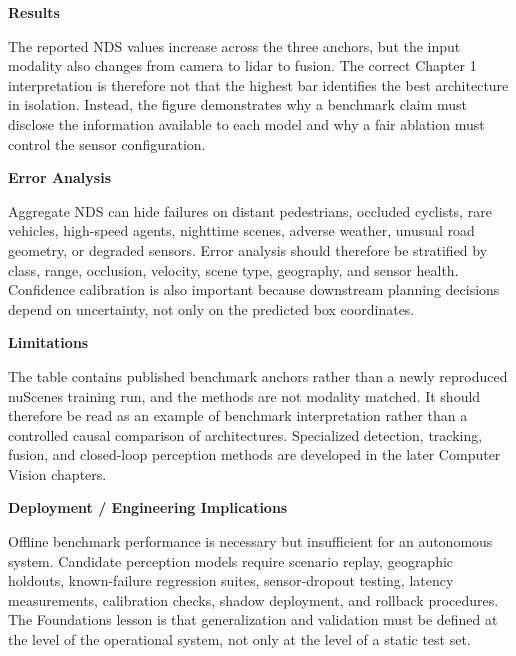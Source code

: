 \textbf{Results}

The reported NDS values increase across the three anchors, but the input modality also changes from camera to lidar to fusion. The correct Chapter 1 interpretation is therefore not that the highest bar identifies the best architecture in isolation. Instead, the figure demonstrates why a benchmark claim must disclose the information available to each model and why a fair ablation must control the sensor configuration.

\textbf{Error Analysis}

Aggregate NDS can hide failures on distant pedestrians, occluded cyclists, rare vehicles, high-speed agents, nighttime scenes, adverse weather, unusual road geometry, or degraded sensors. Error analysis should therefore be stratified by class, range, occlusion, velocity, scene type, geography, and sensor health. Confidence calibration is also important because downstream planning decisions depend on uncertainty, not only on the predicted box coordinates.

\textbf{Limitations}

The table contains published benchmark anchors rather than a newly reproduced nuScenes training run, and the methods are not modality matched. It should therefore be read as an example of benchmark interpretation rather than a controlled causal comparison of architectures. Specialized detection, tracking, fusion, and closed-loop perception methods are developed in the later Computer Vision chapters.

\textbf{Deployment / Engineering Implications}

Offline benchmark performance is necessary but insufficient for an autonomous system. Candidate perception models require scenario replay, geographic holdouts, known-failure regression suites, sensor-dropout testing, latency measurements, calibration checks, shadow deployment, and rollback procedures. The Foundations lesson is that generalization and validation must be defined at the level of the operational system, not only at the level of a static test set.
